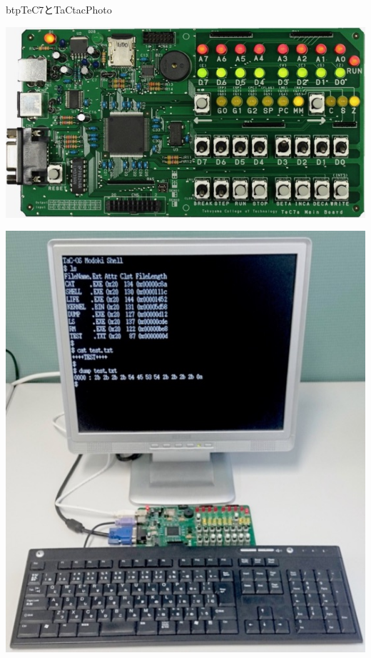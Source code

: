 \begin{myfig}{btp}{TeC7とTaC}{tacPhoto}
  \begin{minipage}{0.58\columnwidth}
    \begin{center}
      \includegraphics[scale=0.35]{Photo/TeC7.jpg}\\
    \end{center}
  \end{minipage}
  \begin{minipage}{0.38\columnwidth}
    \begin{center}
      \includegraphics[scale=0.29]{Photo/TaC.jpg}\\
    \end{center}
  \end{minipage}
\end{myfig}

